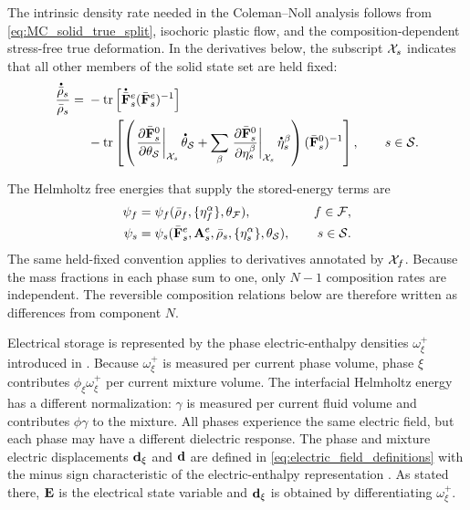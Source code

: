 The intrinsic density rate needed in the Coleman--Noll analysis follows from
\eqref{eq:MC_solid_true_split}, isochoric plastic flow, and the
composition-dependent stress-free true deformation.  In the derivatives below,
the subscript \(\mathcal{X}_s\) indicates that all other members of the solid state
set are held fixed:
%
\begin{align}
	\frac{\phasedot{\bar\rho}_s}{\bar\rho_s}
	={} &
	-\operatorname{tr}
	\left[
		\phasedot{\bar{\mbf F}}_s^e
		(\bar{\mbf F}_s^e)^{-1}
		\right]
	\notag  \\
	    & -
	\operatorname{tr}\left[
		\left(
		\left.
		\p{\bar{\mbf F}_s^0}{\theta_{\mc S}}
		\right\vert_{\mc X_s}
		\phasedot\theta_{\mc S}
		+
		\sum_\beta
		\left.
		\p{\bar{\mbf F}_s^0}{\eta_s^\beta}
		\right\vert_{\mc X_s}
		\phasedot\eta_s^\beta
		\right)
		(\bar{\mbf F}_s^0)^{-1}
		\right],
		\qquad
		s\in\mc S .
	\label{eq:MC_solid_density_rate}
\end{align}
%

The Helmholtz free energies that supply the stored-energy terms are
%
\begin{equation}
	\begin{alignedat}{2}
		\psi_f
		& =
		\psi_f(
		\bar\rho_f,\{\eta_f^\alpha\},\theta_{\mathcal{F}}),
		\qquad&
		f\in\mathcal{F},
		\\
		\psi_s
		& =
		\psi_s(
		\bar{\mathbf{F}}_s^e,\mathbf{A}_s^e,
		\bar\rho_s,\{\eta_s^\alpha\},\theta_{\mathcal{S}}),
		\qquad&
		s\in\mathcal{S} .
	\end{alignedat}
	\label{eq:MC_solid_general_free_energy}
\end{equation}
%
The same held-fixed convention applies to derivatives annotated by
\(\mathcal{X}_f\).  Because the mass fractions in each phase sum to one, only
\(N-1\) composition rates are independent.  The reversible composition
relations below are therefore written as differences from component \(N\).

\pagebreak[3]
Electrical storage is represented by the phase electric-enthalpy densities
\(\omega^{+}_{\xi}\) introduced in .  Because
\(\omega_\xi^+\) is measured per current phase volume, phase \(\xi\) contributes
\(\phi_\xi\omega_\xi^+\) per current mixture volume.  The interfacial Helmholtz
energy has a different normalization: \(\gamma\) is measured per current fluid
volume and contributes \(\phi\gamma\) to the mixture.  All phases experience
the same electric field, but each phase may have a different dielectric
response.  The phase and mixture electric displacements \(\mathbf{d}_\xi\) and
\(\mathbf{d}\) are defined in \eqref{eq:electric_field_definitions} with the
minus sign characteristic of the electric-enthalpy representation
\cite{dorfmann2017nonlinear_electroelasticity}.  As stated there, \(\mathbf{E}\)
is the electrical state variable and \(\mathbf{d}_\xi\) is obtained by
differentiating \(\omega_\xi^+\).

